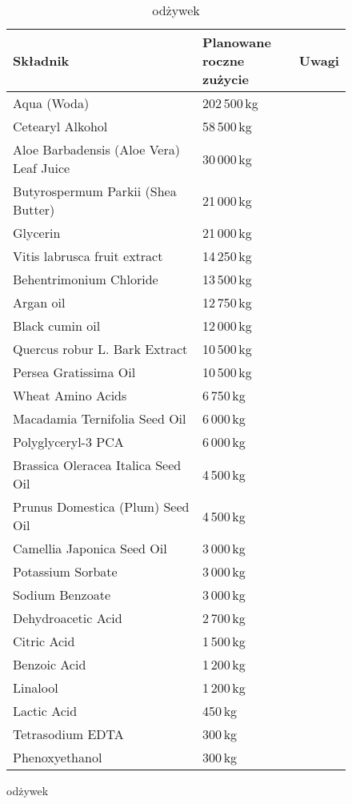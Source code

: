 \begin{table}[H]
\begin{footnotesize}
	\begin{subfigure}{0.7\textwidth}
		\centering
		\caption{odżywek}
		\begin{tabular}{p{}ll}
			\hline
			\textbf{Składnik} & \makecell[l]{\textbf{Planowane} \\ \textbf{roczne zużycie}} & \textbf{Uwagi} \\
			\hline\hline
			Aqua (Woda) & 202\,500\,kg & \\
			Cetearyl Alkohol & 58\,500\,kg & \\
			Aloe Barbadensis (Aloe Vera) Leaf Juice & 30\,000\,kg & \\
			Butyrospermum Parkii (Shea Butter) & 21\,000\,kg & \\
			Glycerin & 21\,000\,kg & \\
			Vitis labrusca fruit extract & 14\,250\,kg & \\
			Behentrimonium Chloride & 13\,500\,kg & \\
			Argan oil & 12\,750\,kg & \\
			Black cumin oil & 12\,000\,kg & \\
			Quercus robur L. Bark Extract & 10\,500\,kg & \\
			Persea Gratissima Oil & 10\,500\,kg & \\
			Wheat Amino Acids & 6\,750\,kg & \\
			Macadamia Ternifolia Seed Oil & 6\,000\,kg & \\
			Polyglyceryl-3 PCA & 6\,000\,kg & \\
			Brassica Oleracea Italica Seed Oil & 4\,500\,kg & \\
			Prunus Domestica (Plum) Seed Oil & 4\,500\,kg & \\
			Camellia Japonica Seed Oil & 3\,000\,kg & \\
			Potassium Sorbate & 3\,000\,kg & \\
			Sodium Benzoate & 3\,000\,kg & \\
			Dehydroacetic Acid & 2\,700\,kg & \\
			Citric Acid & 1\,500\,kg & \\
			Benzoic Acid & 1\,200\,kg & \\
			Linalool & 1\,200\,kg & \\
			Lactic Acid & 450\,kg & \\
			Tetrasodium EDTA & 300\,kg & \\
			Phenoxyethanol & 300\,kg & \\
			\hline
		\end{tabular}
	\end{subfigure}
\end{footnotesize}
\end{table}

